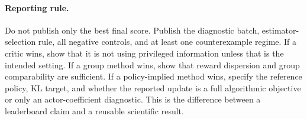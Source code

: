 \documentclass[11pt]{article}
\begin{document}
\paragraph{Reporting rule.}
Do not publish only the best final score. Publish the diagnostic batch,
estimator-selection rule, all negative controls, and at least one counterexample
regime. If a critic wins, show that it is not using privileged information
unless that is the intended setting. If a group method wins, show that reward
dispersion and group comparability are sufficient. If a policy-implied method
wins, specify the reference policy, KL target, and whether the reported update
is a full algorithmic objective or only an actor-coefficient diagnostic. This
is the difference between a leaderboard claim and a reusable scientific result.



\end{document}
